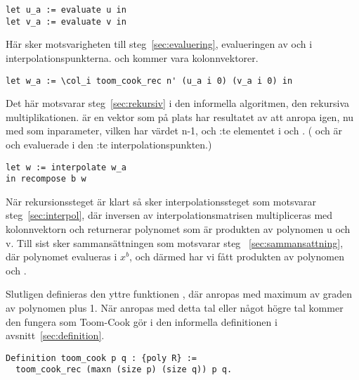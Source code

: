 \begin{lstlisting}
let u_a := evaluate u in
let v_a := evaluate v in
\end{lstlisting}

Här sker motsvarigheten till steg~\ref{sec:evaluering}, evalueringen av 
och  i interpolationspunkterna.  och  kommer vara
kolonnvektorer.

\begin{lstlisting}
let w_a := \col_i toom_cook_rec n' (u_a i 0) (v_a i 0) in
\end{lstlisting}

Det här motsvarar steg~\ref{sec:rekursiv} i den informella algoritmen, den
rekursiva multiplikationen.  är en vektor som på plats  har
resultatet av att anropa  igen, nu med  som inparameter,
vilken har värdet n-1, och :te elementet i  och . ( och  är  och  evaluerade i den :te
interpolationspunkten.)
\begin{lstlisting}
let w := interpolate w_a
in recompose b w
\end{lstlisting}
När rekursionssteget är klart så sker interpolationssteget som motsvarar
steg~\ref{sec:interpol}, där inversen av interpolationsmatrisen multipliceras
med kolonnvektorn  och returnerar polynomet  som är produkten av
polynomen u och v. Till sist sker sammansättningen som motsvarar steg~
\ref{sec:sammansattning}, där polynomet  evalueras i $x^b$, och därmed har
vi fått produkten av polynomen  och .

Slutligen definieras den yttre funktionen , där 
anropas med maximum av graden av polynomen plus 1. När 
anropas med detta tal eller något högre tal kommer den fungera som Toom-Cook
gör i den informella definitionen i avsnitt~\ref{sec:definition}.
\begin{lstlisting}
Definition toom_cook p q : {poly R} :=
  toom_cook_rec (maxn (size p) (size q)) p q.
\end{lstlisting}
